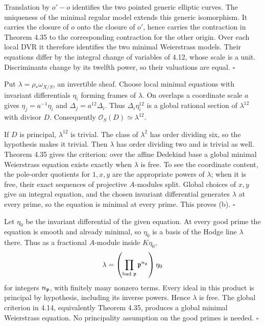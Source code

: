 \documentclass[11pt]{article}
\let\chapterexercise\exercise
\renewcommand{\exercise}[2]{\Needspace{8\baselineskip}\chapterexercise{#1}{#2}}
\begin{document}
\pf Translation by $o'-o$ identifies the two pointed generic elliptic curves. The uniqueness of the minimal regular model extends this generic isomorphism. It carries the closure of $o$ onto the closure of $o'$, hence carries the contraction in Theorem 4.35 to the corresponding contraction for the other origin. Over each local DVR it therefore identifies the two minimal Weierstrass models. Their equations differ by the integral change of variables of 4.12, whose scale is a unit. Discriminants change by its twelfth power, so their valuations are equal. \hfill$\square$

\pf Put $\lambda=\rho_*\omega_{X/S}$, an invertible sheaf. Choose local minimal equations with invariant differentials $\eta_i$ forming frames of $\lambda$. On overlaps a coordinate scale $a$ gives $\eta_j=a^{-1}\eta_i$ and $\Delta_j=a^{12}\Delta_i$. Thus $\Delta_i\eta_i^{12}$ is a global rational section of $\lambda^{12}$ with divisor $D$. Consequently $\mathcal O_S(D)\simeq\lambda^{12}$.

If $D$ is principal, $\lambda^{12}$ is trivial. The class of $\lambda^2$ has order dividing six, so the hypothesis makes it trivial. Then $\lambda$ has order dividing two and is trivial as well. Theorem 4.35 gives the criterion: over the affine Dedekind base a global minimal Weierstrass equation exists exactly when $\lambda$ is free. To see the coordinate content, the pole-order quotients for $1,x,y$ are the appropriate powers of $\lambda$; when it is free, their exact sequences of projective $A$-modules split. Global choices of $x,y$ give an integral equation, and the chosen invariant differential generates $\lambda$ at every prime, so the equation is minimal at every prime. This proves (b). \hfill$\square$

\pf Let $\eta_0$ be the invariant differential of the given equation. At every good prime the equation is smooth and already minimal, so $\eta_0$ is a basis of the Hodge line $\lambda$ there. Thus as a fractional $A$-module inside $K\eta_0$,
\[ \lambda=\left(\prod_{\text{bad }\mathfrak p}\mathfrak p^{n_\mathfrak p}\right)\eta_0 \]
for integers $n_\mathfrak p$, with finitely many nonzero terms. Every ideal in this product is principal by hypothesis, including its inverse powers. Hence $\lambda$ is free. The global criterion in 4.14, equivalently Theorem 4.35, produces a global minimal Weierstrass equation. No principality assumption on the good primes is needed. \hfill$\square$
\end{document}
